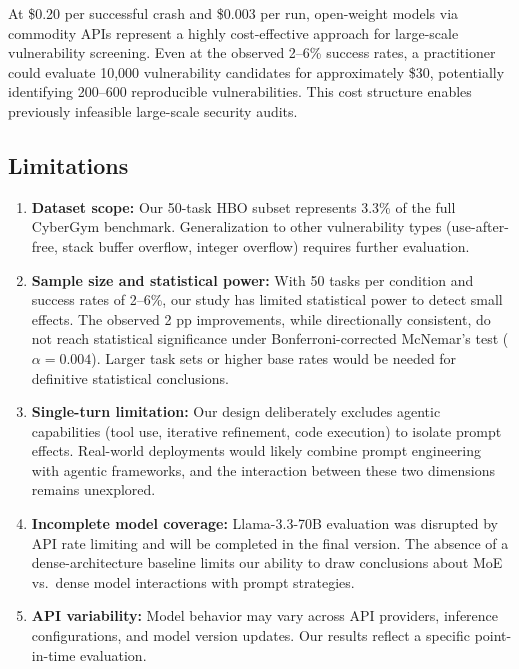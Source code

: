 \documentclass{ieeeaccess}
\begin{document}
At \$0.20 per successful crash and \$0.003 per run, open-weight models via commodity APIs represent a highly cost-effective approach for large-scale vulnerability screening. Even at the observed 2--6\% success rates, a practitioner could evaluate 10,000 vulnerability candidates for approximately \$30, potentially identifying 200--600 reproducible vulnerabilities. This cost structure enables previously infeasible large-scale security audits.

\subsection{Limitations}

\begin{enumerate}
    \item \textbf{Dataset scope:} Our 50-task HBO subset represents 3.3\% of the full CyberGym benchmark. Generalization to other vulnerability types (use-after-free, stack buffer overflow, integer overflow) requires further evaluation.
    
    \item \textbf{Sample size and statistical power:} With 50 tasks per condition and success rates of 2--6\%, our study has limited statistical power to detect small effects. The observed 2 pp improvements, while directionally consistent, do not reach statistical significance under Bonferroni-corrected McNemar's test ($\alpha = 0.004$). Larger task sets or higher base rates would be needed for definitive statistical conclusions.
    
    \item \textbf{Single-turn limitation:} Our design deliberately excludes agentic capabilities (tool use, iterative refinement, code execution) to isolate prompt effects. Real-world deployments would likely combine prompt engineering with agentic frameworks, and the interaction between these two dimensions remains unexplored.
    
    \item \textbf{Incomplete model coverage:} Llama-3.3-70B evaluation was disrupted by API rate limiting and will be completed in the final version. The absence of a dense-architecture baseline limits our ability to draw conclusions about MoE vs.\ dense model interactions with prompt strategies.
    
    \item \textbf{API variability:} Model behavior may vary across API providers, inference configurations, and model version updates. Our results reflect a specific point-in-time evaluation.
\end{enumerate}
\end{document}
